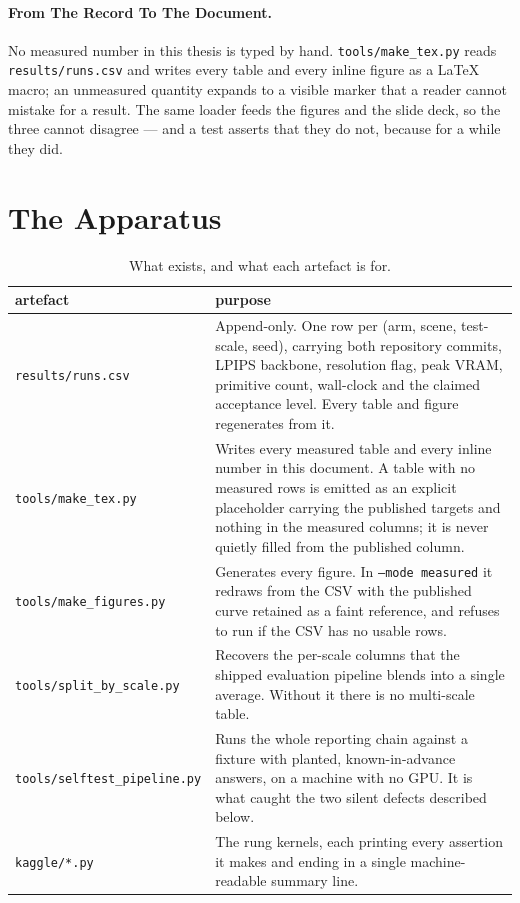 \paragraph{From The Record To The Document.} No measured number in this thesis is
typed by hand. \texttt{tools/make\_tex.py} reads \texttt{results/runs.csv} and
writes every table and every inline figure as a LaTeX macro; an unmeasured quantity expands to a visible marker that a reader cannot mistake
for a result. The same loader feeds the figures and the slide deck, so the three cannot
disagree --- and a test asserts that they do not, because for a while they did.

\section{The Apparatus}
\label{app:artefacts}

\begin{table}[htbp]
  \centering
  \caption{What exists, and what each artefact is for.}
  \small
  \begin{tabularx}{\linewidth}{L{0.70}L{1.30}}
    \toprule
    artefact & purpose \\
    \midrule
    \texttt{results/runs.csv} & Append-only. One row per (arm, scene, test-scale, seed), carrying both repository commits, LPIPS backbone, resolution flag, peak VRAM, primitive count, wall-clock and the claimed acceptance level. Every table and figure regenerates from it. \\
    \texttt{tools/make\_tex.py} & Writes every measured table and every inline number in this document. A table with no measured rows is emitted as an explicit placeholder carrying the published targets and nothing in the measured columns; it is never quietly filled from the published column. \\
    \texttt{tools/make\_figures.py} & Generates every figure. In \texttt{--mode measured} it redraws from the CSV with the published curve retained as a faint reference, and refuses to run if the CSV has no usable rows. \\
    \texttt{tools/split\_by\_scale.py} & Recovers the per-scale columns that the shipped evaluation pipeline blends into a single average. Without it there is no multi-scale table. \\
    \texttt{tools/selftest\_pipeline.py} & Runs the whole reporting chain against a fixture with planted, known-in-advance answers, on a machine with no GPU. It is what caught the two silent defects described below. \\
    \texttt{kaggle/*.py} & The rung kernels, each printing every assertion it makes and ending in a single machine-readable summary line. \\
    \bottomrule
  \end{tabularx}
\end{table}

